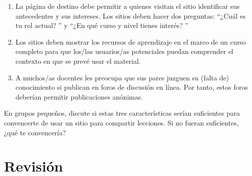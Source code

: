 \begin{enumerate}
 
\item
  La página de destino debe permitir a quienes visitan el sitio
identificar sus antecedentes y sus intereses.
Los sitios deben hacer dos preguntas:
``¿Cuál es tu rol actual? '' y
``¿En qué curso y nivel tienes interés? ''
 
\item
  Los sitios deben mostrar los recursos de aprendizaje
en el marco de un curso completo para que los/las usuarios/as potenciales puedan comprender
el contexto en que se prevé usar el material.
 
\item
  A muchos/as docentes les preocupa que sus pares
juzguen su (falta de) conocimiento si publican en foros de discusión
en línea.
Por tanto, estos foros deberían permitir publicaciones anónimas.
\end{enumerate}

En grupos pequeños,
discute si estas tres características serían
suficientes para convencerte de usar un sitio para compartir lecciones. Si no fueran suficientes, ¿qué te convencería?

 
\section*{Revisión}
 
